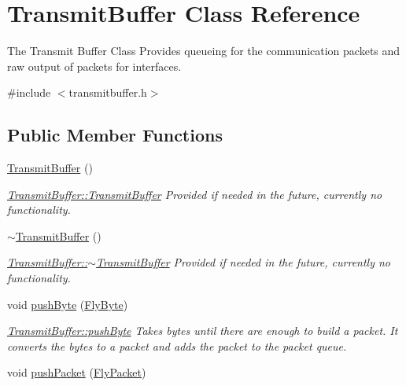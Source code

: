 \hypertarget{class_transmit_buffer}{}\section{Transmit\+Buffer Class Reference}
\label{class_transmit_buffer}


The Transmit Buffer Class Provides queueing for the communication packets and raw output of packets for interfaces.  




{\ttfamily \#include $<$transmitbuffer.\+h$>$}

\subsection*{Public Member Functions}
\begin{DoxyCompactItemize}
\item 
\hyperlink{class_transmit_buffer_adb5f67b087b5c8d1996f9f7b6fb42341}{Transmit\+Buffer} ()
\begin{DoxyCompactList}\small\item\em \hyperlink{class_transmit_buffer_adb5f67b087b5c8d1996f9f7b6fb42341}{Transmit\+Buffer\+::\+Transmit\+Buffer} Provided if needed in the future, currently no functionality. \end{DoxyCompactList}\item 
\hyperlink{class_transmit_buffer_a9de4adf2b6fef27e9f35ce3392fb12d2}{$\sim$\+Transmit\+Buffer} ()
\begin{DoxyCompactList}\small\item\em \hyperlink{class_transmit_buffer_a9de4adf2b6fef27e9f35ce3392fb12d2}{Transmit\+Buffer\+::$\sim$\+Transmit\+Buffer} Provided if needed in the future, currently no functionality. \end{DoxyCompactList}\item 
void \hyperlink{class_transmit_buffer_aa7966064a6abaeb5ff3f7c8ff0402ec3}{push\+Byte} (\hyperlink{conversions_8h_a1f006e31a957accfe6aa1bf6f401efce}{Fly\+Byte})
\begin{DoxyCompactList}\small\item\em \hyperlink{class_transmit_buffer_aa7966064a6abaeb5ff3f7c8ff0402ec3}{Transmit\+Buffer\+::push\+Byte} Takes bytes until there are enough to build a packet. It converts the bytes to a packet and adds the packet to the packet queue. \end{DoxyCompactList}\item 
void \hyperlink{class_transmit_buffer_a002757b58f4227167db20c8977bbdb28}{push\+Packet} (\hyperlink{class_fly_packet}{Fly\+Packet})

\end{DoxyCompactItemize}
